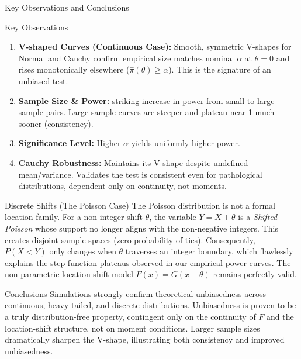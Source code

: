 \documentclass[8pt]{beamer}
\begin{document}
\begin{frame}{Key Observations and Conclusions}
    \fontsize{7.5pt}{8pt}\selectfont %
    
    \begin{alertblock}{Key Observations}
        \begin{enumerate}
            \item \textbf{V-shaped Curves (Continuous Case):} Smooth, symmetric V-shapes for Normal and Cauchy confirm empirical size matches nominal $\alpha$ at $\theta=0$ and rises monotonically elsewhere ($\hat{\pi}(\theta) \geq \alpha$). This is the signature of an unbiased test.
            \item \textbf{Sample Size & Power:} striking increase in power from small to large sample pairs. Large-sample curves are steeper and plateau near 1 much sooner (consistency).
            \item \textbf{Significance Level:} Higher $\alpha$ yields uniformly higher power.
            \item \textbf{Cauchy Robustness:} Maintains its V-shape despite undefined mean/variance. Validates the test is consistent even for pathological distributions, dependent only on continuity, not moments.
        \end{enumerate}
    \end{alertblock}
    \begin{block}{Discrete Shifts (The Poisson Case)}
    The Poisson distribution is not a formal location family. For a non-integer shift $\theta$, the variable $Y = X + \theta$ is a \textit{Shifted Poisson} whose support no longer aligns with the non-negative integers. This creates disjoint sample spaces (zero probability of ties). Consequently, $P(X < Y)$ only changes when $\theta$ traverses an integer boundary, which flawlessly explains the step-function plateaus observed in our empirical power curves. The non-parametric location-shift model $F(x) = G(x-\theta)$ remains perfectly valid.
\end{block}
    \begin{exampleblock}{Conclusions}
        Simulations strongly confirm theoretical unbiasedness across continuous, heavy-tailed, and discrete distributions. Unbiasedness is proven to be a truly distribution-free property, contingent only on the continuity of $F$ and the location-shift structure, not on moment conditions. Larger sample sizes dramatically sharpen the V-shape, illustrating both consistency and improved unbiasedness.
    \end{exampleblock}
\end{frame}
\end{document}

